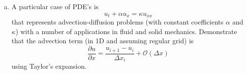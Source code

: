 \documentclass[calculator,datasheet,resit]{exam}
\newcommand{\frc}{\displaystyle\frac}
\begin{document}
\clearpage

\begin{question}
\begin{enumerate}[(a)]
\item A particular case of PDE's is
\begin{displaymath}
u_{t}+\alpha u_{x} = \kappa u_{xx}
\end{displaymath}
that represents advection-diffusion problems (with constant coefficients $\alpha$ and $\kappa$) with a number of applications in fluid and solid mechanics. Demonstrate that the advection term (in 1D and assuming regular grid) is
\begin{displaymath}
\frc{\partial u}{\partial x}=\frc{u_{i+1}-u_{i}}{\Delta x_{i}} + \mathcal{O}\left(\Delta x\right)
\end{displaymath}
using Taylor's expansion.
\end{enumerate}
\end{question}


\vfill


\paperend
\end{document}
